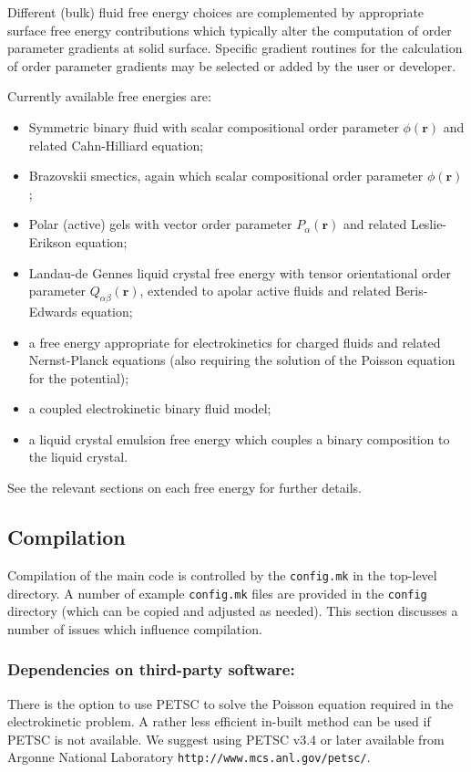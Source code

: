 Different (bulk) fluid free energy choices are complemented by
appropriate surface free energy contributions which typically
alter the computation of order parameter gradients at solid
surface. Specific gradient routines for the calculation of
order parameter gradients may be selected or added by the
user or developer.

Currently available free energies are:
\begin{itemize}
\item Symmetric binary fluid with scalar compositional order parameter
$\phi(\mathbf{r})$ and related Cahn-Hilliard equation;
\item Brazovskii smectics, again which scalar compositional order parameter
$\phi(\mathbf{r})$;
\item Polar (active) gels with vector order parameter $P_\alpha (\mathbf{r})$
and related Leslie-Erikson equation;
\item Landau-de Gennes liquid crystal free energy with tensor
orientational order parameter $Q_{\alpha\beta}(\mathbf{r})$, extended to
apolar active fluids and related Beris-Edwards equation;
\item a free energy appropriate for electrokinetics for charged fluids
and related Nernst-Planck equations (also requiring the solution of the
Poisson equation for the potential);
\item a coupled electrokinetic binary fluid model;
\item a liquid crystal emulsion free energy which couples a binary
composition to the liquid crystal.
\end{itemize}
See the relevant sections on each free energy for further details.

\subsection{Compilation}

Compilation of the main code is controlled by the \texttt{config.mk} in
the  top-level directory. A number of example \texttt{config.mk} files
are provided in the \texttt{config} directory (which can be copied and
adjusted as needed). This section discusses a number of issues
which influence compilation.

\subsubsection{Dependencies on third-party software:}
There is the option to use PETSC to solve the Poisson equation required in
the electrokinetic problem. A rather less efficient in-built method
can be used if PETSC is not available.
We suggest using PETSC
v3.4 or later available from Argonne National Laboratory
\texttt{http://www.mcs.anl.gov/petsc/}.

\vfill
\pagebreak

